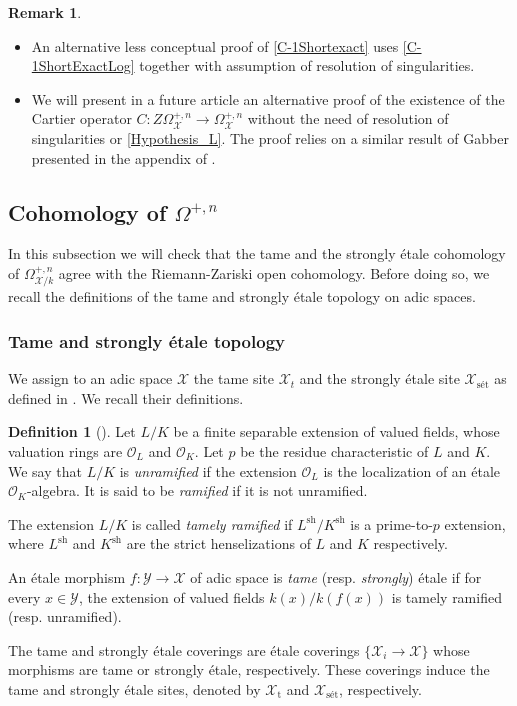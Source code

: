 \documentclass{amsart}
\theoremstyle{definition}
\newtheorem{definition}[theorem]{Definition}
\newtheorem{remark}[theorem]{Remark}
\newcommand\tame{\textrm{t}}
\newcommand\sett{\textrm{s\'et}}
\newcommand{\mX}{\mathcal{X}}
\numberwithin{equation}{section}
\begin{document}
\begin{remark}
	\begin{itemize}
		\item An alternative less conceptual proof of \cref{C-1Shortexact} uses \cref{C-1ShortExactLog} together with assumption of resolution of singularities.
		\item We will present in a future article an alternative proof of the existence of the Cartier operator $C:Z\Omega_\mX^{+,n}\to \Omega_\mX^{+,n}$ without the need of resolution of singularities or \cref{Hypothesis_L}. The proof relies on a similar result of Gabber presented in the appendix of \cite{KSTVoerst}.
	\end{itemize}

\end{remark}



\subsection{Cohomology of \texorpdfstring{$\Omega^{+,n}$}{Omega⁺}}
In this subsection we will check that the tame and the strongly \'etale cohomology of $\Omega^{+,n}_{\mathcal{X}/k}$ agree with the Riemann-Zariski open cohomology. Before doing so, we recall the definitions of the tame and strongly \'etale topology on adic spaces. 
 \subsubsection*{Tame and strongly \'etale topology}
 We assign to an adic space $\mathcal{X}$ the tame site $\mathcal{X}_t$ and the strongly \'etale site $\mathcal{X}_\textrm{s\'et}$ as defined in \cite{HTame}. We recall their definitions.
 \begin{definition}[{\cite[Definition 3.3.]{HTame}}]
	Let $L/K$ be a finite separable extension of valued fields, whose valuation rings are $\mathcal{O}_L$ and $\mathcal{O}_K$. Let $p$ be the residue characteristic of $L$ and $K$. We say that $L/K$ is \textit{unramified} if the extension $\mathcal{O}_L$ is the localization of an \'etale $\mathcal{O}_K$-algebra. It is said to be \textit{ramified} if it is not unramified.
	
	The extension $L/K$ is called \textit{tamely ramified} if $L^{\textrm{sh}}/K^{\textrm{sh}}$ is a prime-to-$p$ extension, where $L^{\textrm{sh}}$ and $K^{\textrm{sh}}$ are the strict henselizations of $L$ and $K$ respectively.  
	
	An \'etale morphism $f:\mathcal{Y}\to \mathcal{X}$ of adic space is \textit{tame} (resp. \textit{strongly}) \'etale if for every $x\in \mathcal{Y}$, the extension of valued fields $k(x)/k(f(x))$ is tamely ramified (resp. unramified).
	
	The tame and strongly \'etale coverings are \'etale coverings $\{\mathcal{X}_i\to \mathcal{X}\}$ whose morphisms are tame or strongly \'etale, respectively. These coverings induce the tame and strongly \'etale sites, denoted by $\mathcal{X}_{\tame}$ and $\mathcal{X}_{\sett}$, respectively.
 \end{definition}
 
\end{document}
